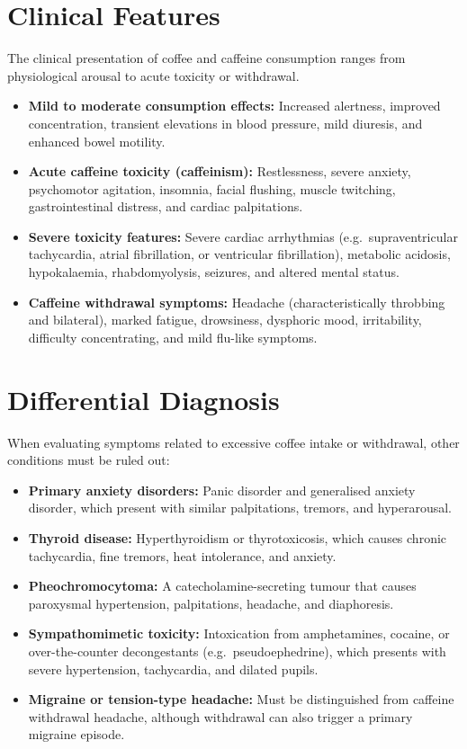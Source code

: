 \section*{Clinical Features}
The clinical presentation of coffee and caffeine consumption ranges from physiological arousal to acute toxicity or withdrawal.
\begin{itemize}
    \item \textbf{Mild to moderate consumption effects:} Increased alertness, improved concentration, transient elevations in blood pressure, mild diuresis, and enhanced bowel motility.
    \item \textbf{Acute caffeine toxicity (caffeinism):} Restlessness, severe anxiety, psychomotor agitation, insomnia, facial flushing, muscle twitching, gastrointestinal distress, and cardiac palpitations.
    \item \textbf{Severe toxicity features:} Severe cardiac arrhythmias (e.g.\ supraventricular tachycardia, atrial fibrillation, or ventricular fibrillation), metabolic acidosis, hypokalaemia, rhabdomyolysis, seizures, and altered mental status.
    \item \textbf{Caffeine withdrawal symptoms:} Headache (characteristically throbbing and bilateral), marked fatigue, drowsiness, dysphoric mood, irritability, difficulty concentrating, and mild flu-like symptoms.
\end{itemize}

\section*{Differential Diagnosis}
When evaluating symptoms related to excessive coffee intake or withdrawal, other conditions must be ruled out:
\begin{itemize}
    \item \textbf{Primary anxiety disorders:} Panic disorder and generalised anxiety disorder, which present with similar palpitations, tremors, and hyperarousal.
    \item \textbf{Thyroid disease:} Hyperthyroidism or thyrotoxicosis, which causes chronic tachycardia, fine tremors, heat intolerance, and anxiety.
    \item \textbf{Pheochromocytoma:} A catecholamine-secreting tumour that causes paroxysmal hypertension, palpitations, headache, and diaphoresis.
    \item \textbf{Sympathomimetic toxicity:} Intoxication from amphetamines, cocaine, or over-the-counter decongestants (e.g.\ pseudoephedrine), which presents with severe hypertension, tachycardia, and dilated pupils.
    \item \textbf{Migraine or tension-type headache:} Must be distinguished from caffeine withdrawal headache, although withdrawal can also trigger a primary migraine episode.
\end{itemize}

